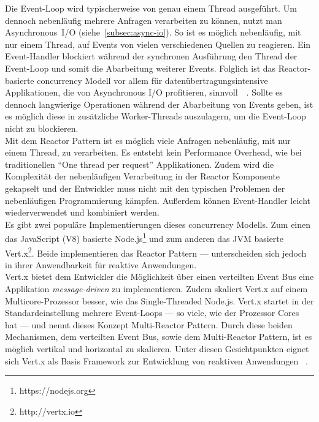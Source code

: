 Die Event-Loop wird typischerweise von genau einem Thread ausgeführt. Um dennoch nebenläufig mehrere Anfragen verarbeiten zu können, nutzt man Asynchronous~I/O (siehe~\ref{subsec:async-io}). So ist es möglich nebenläufig, mit nur einem Thread, auf Events von vielen verschiedenen Quellen zu reagieren. Ein Event-Handler blockiert während der synchronen Ausführung den Thread der Event-Loop und somit die Abarbeitung weiterer Events. Folglich ist das Reactor-basierte \gls{concurrency} Modell vor allem für datenübertragungsintensive Applikationen, die von Asynchronous I/O profitieren, sinnvoll~\cite[S.~73]{kuhn_reactive_2015}~\cite[S.~92]{erb_concurrent_2012}. Sollte es dennoch langwierige Operationen während der Abarbeitung von Events geben, ist es möglich diese in zusätzliche Worker-Threads auszulagern, um die Event-Loop nicht zu blockieren.\\
Mit dem Reactor Pattern ist es möglich viele Anfragen nebenläufig, mit nur einem Thread, zu verarbeiten. Es entsteht kein Performance Overhead, wie bei traditionellen \enquote{One thread per request} Applikationen. Zudem wird die Komplexität der nebenläufigen Verarbeitung in der Reactor Komponente gekapselt und der Entwickler muss nicht mit den typischen Problemen der nebenläufigen Programmierung kämpfen. Außerdem können Event-Handler leicht wiederverwendet und kombiniert werden.\\
Es gibt zwei populäre Implementierungen dieses \gls{concurrency} Modells. Zum einen das JavaScript (V8) basierte Node.js\footnote{https://nodejs.org} und zum anderen das JVM basierte Vert.x\footnote{http://vertx.io}. Beide implementieren das Reactor Pattern --- unterscheiden sich jedoch in ihrer Anwendbarkeit für reaktive Anwendungen.\\
Vert.x bietet dem Entwickler die Möglichkeit über einen verteilten Event Bus eine Applikation \textit{message-driven} zu implementieren. Zudem skaliert Vert.x auf einem Multicore-Prozessor besser, wie das Single-Threaded Node.js. Vert.x startet in der Standardeinstellung mehrere Event-Loops --- so viele, wie der Prozessor Cores hat --- und nennt dieses Konzept Multi-Reactor Pattern. Durch diese beiden Mechanismen, dem verteilten Event Bus, sowie dem Multi-Reactor Pattern, ist es möglich vertikal und horizontal zu skalieren. Unter diesen Gesichtpunkten eignet sich Vert.x als Basis Framework zur Entwicklung von reaktiven Anwendungen~\cite[S.~74]{kuhn_reactive_2015} \cite[S.~93~\&~S.~94]{erb_concurrent_2012}.

\pagebreak

